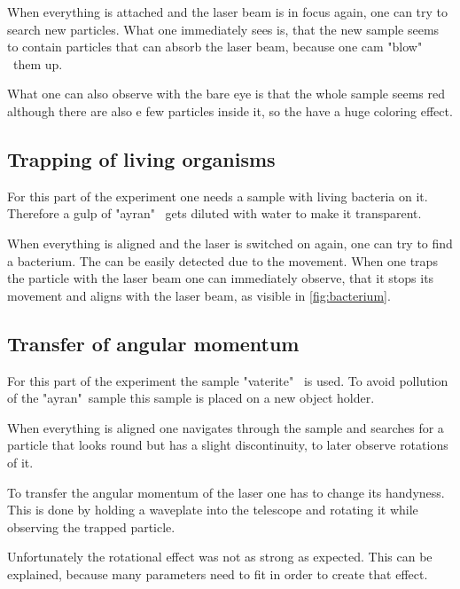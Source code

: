 \documentclass[12pt,english,ngerman]{scrartcl}
\begin{document}
When everything is attached and the laser beam is in focus again, one can try to search new particles.
What one immediately sees is, that the new sample seems to contain particles that can absorb the laser beam,
because one cam "blow" \ them up.


What one can also observe with the bare eye is that the whole sample seems red although there are also e few particles inside it,
so the have a huge coloring effect.

\subsection{Trapping of living organisms}

For this part of the experiment one needs a sample with living bacteria on it. Therefore a gulp of "ayran" \ gets diluted with 
water to make it transparent.

When everything is aligned and the laser is switched on again, one can try to find a bacterium. 
The can be easily detected due to the movement. When one traps the particle with the laser beam one can immediately observe, that
it stops its movement and aligns with the laser beam, as visible in \autoref{fig:bacterium}.





\subsection{Transfer of angular momentum}

For this part of the experiment the sample "vaterite" \ is used. To avoid pollution of the "ayran"\ sample this sample is 
placed on a new object holder.

When everything is aligned one navigates through the sample and searches for a particle that looks round but has a slight discontinuity, 
to later observe rotations of it.

To transfer the angular momentum of the laser one has to change its handyness. This is done by holding a waveplate into the telescope
and rotating it while observing the trapped particle.

Unfortunately the rotational effect was not as strong as expected. This can be explained, because many parameters need to fit in 
order to create that effect.

\end{document}
